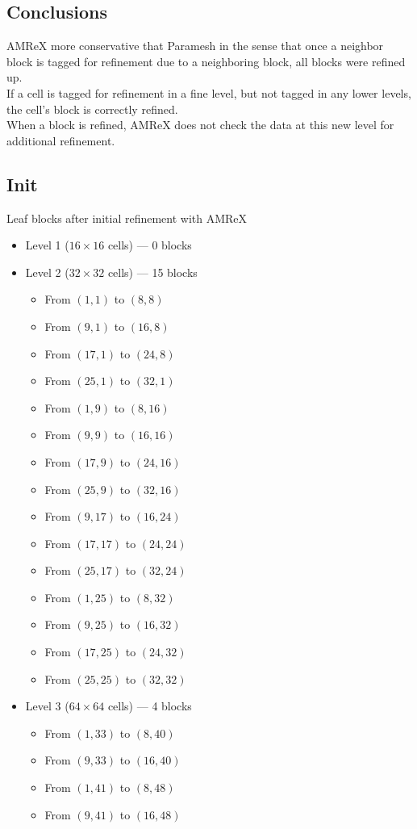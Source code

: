 \documentclass[12pt,letterpaper]{article}
\begin{document}
\subsection{Conclusions}
AMReX more conservative that Paramesh in the sense that once a neighbor block is
tagged for refinement due to a neighboring block, all blocks were refined up.\\

If a cell is tagged for refinement in a fine level, but not tagged in any lower
levels, the cell's block is correctly refined.\\

When a block is refined, AMReX does not check the data at this new level for
additional refinement.

\newpage
\subsection{Init}
Leaf blocks after initial refinement with AMReX
\begin{itemize}
\item{Level 1 ($16 \times 16$ cells) --- 0 blocks}
\item{Level 2 ($32 \times 32$ cells) --- 15 blocks}
    \begin{itemize}
    \item{From $( 1, 1)$ to $( 8, 8)$}
    \item{From $( 9, 1)$ to $(16, 8)$}
    \item{From $(17, 1)$ to $(24, 8)$}
    \item{From $(25, 1)$ to $(32, 1)$}
    \item{From $( 1, 9)$ to $( 8,16)$}
    \item{From $( 9, 9)$ to $(16,16)$}
    \item{From $(17, 9)$ to $(24,16)$}
    \item{From $(25, 9)$ to $(32,16)$}
    \item{From $( 9,17)$ to $(16,24)$}
    \item{From $(17,17)$ to $(24,24)$}
    \item{From $(25,17)$ to $(32,24)$}
    \item{From $( 1,25)$ to $( 8,32)$}
    \item{From $( 9,25)$ to $(16,32)$}
    \item{From $(17,25)$ to $(24,32)$}
    \item{From $(25,25)$ to $(32,32)$}
    \end{itemize}
\item{Level 3 ($64\times 64$ cells) --- 4 blocks}
    \begin{itemize}
    \item{From $(1,33)$ to $( 8,40)$}
    \item{From $(9,33)$ to $(16,40)$}
    \item{From $(1,41)$ to $( 8,48)$}
    \item{From $(9,41)$ to $(16,48)$}
    \end{itemize}
\end{itemize}
\end{document}
